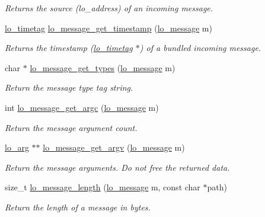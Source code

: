 \begin{DoxyCompactItemize}
\begin{DoxyCompactList}\small\item\em \-Returns the source (lo\-\_\-address) of an incoming message. \end{DoxyCompactList}\item 
\hyperlink{structlo__timetag}{lo\-\_\-timetag} \hyperlink{group__liblolowlevel_ga164e068064afa94454eb6515b9b1748d}{lo\-\_\-message\-\_\-get\-\_\-timestamp} (\hyperlink{lo__types_8h_ad126083c98d941f00eb72d1690b38d63}{lo\-\_\-message} m)
\begin{DoxyCompactList}\small\item\em \-Returns the timestamp (\hyperlink{structlo__timetag}{lo\-\_\-timetag} $\ast$) of a bundled incoming message. \end{DoxyCompactList}\item 
char $\ast$ \hyperlink{group__liblolowlevel_gad3c1a312fd90bb4c35a4c1fac2d0b25d}{lo\-\_\-message\-\_\-get\-\_\-types} (\hyperlink{lo__types_8h_ad126083c98d941f00eb72d1690b38d63}{lo\-\_\-message} m)
\begin{DoxyCompactList}\small\item\em \-Return the message type tag string. \end{DoxyCompactList}\item 
int \hyperlink{group__liblolowlevel_ga5b391362eda2c6019011f3db55049db3}{lo\-\_\-message\-\_\-get\-\_\-argc} (\hyperlink{lo__types_8h_ad126083c98d941f00eb72d1690b38d63}{lo\-\_\-message} m)
\begin{DoxyCompactList}\small\item\em \-Return the message argument count. \end{DoxyCompactList}\item 
\hyperlink{unionlo__arg}{lo\-\_\-arg} $\ast$$\ast$ \hyperlink{group__liblolowlevel_gab28b48cdbefb60eb7e57557ae9d23171}{lo\-\_\-message\-\_\-get\-\_\-argv} (\hyperlink{lo__types_8h_ad126083c98d941f00eb72d1690b38d63}{lo\-\_\-message} m)
\begin{DoxyCompactList}\small\item\em \-Return the message arguments. \-Do not free the returned data. \end{DoxyCompactList}\item 
size\-\_\-t \hyperlink{group__liblolowlevel_ga0855039d071b7031727213272857c27e}{lo\-\_\-message\-\_\-length} (\hyperlink{lo__types_8h_ad126083c98d941f00eb72d1690b38d63}{lo\-\_\-message} m, const char $\ast$path)
\begin{DoxyCompactList}\small\item\em \-Return the length of a message in bytes. \end{DoxyCompactList}\item 
$$
\end{DoxyCompactItemize}
